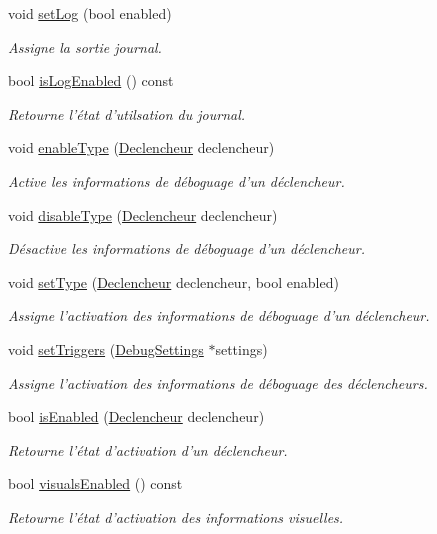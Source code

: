\begin{DoxyCompactItemize}
void \hyperlink{group__inf2990_gafa37fad6a0a050a913eb0e482f1b0282}{set\-Log} (bool enabled)
\begin{DoxyCompactList}\small\item\em Assigne la sortie journal. \end{DoxyCompactList}\item 
bool \hyperlink{group__inf2990_gae22799c006444ad7f48e7de490b41ef0}{is\-Log\-Enabled} () const 
\begin{DoxyCompactList}\small\item\em Retourne l'état d'utilsation du journal. \end{DoxyCompactList}\item 
void \hyperlink{group__inf2990_ga55375c6c14be967ed7f25eed578a6265}{enable\-Type} (\hyperlink{class_debug_afd6ed3c50c08d0a7830cd5253b4ab8b6}{Declencheur} declencheur)
\begin{DoxyCompactList}\small\item\em Active les informations de déboguage d'un déclencheur. \end{DoxyCompactList}\item 
void \hyperlink{group__inf2990_gaefa863abf2c2b3c6c741b88b3f78e8b3}{disable\-Type} (\hyperlink{class_debug_afd6ed3c50c08d0a7830cd5253b4ab8b6}{Declencheur} declencheur)
\begin{DoxyCompactList}\small\item\em Désactive les informations de déboguage d'un déclencheur. \end{DoxyCompactList}\item 
void \hyperlink{group__inf2990_gaf6b5623dc8f2fdc90abb3648499f3415}{set\-Type} (\hyperlink{class_debug_afd6ed3c50c08d0a7830cd5253b4ab8b6}{Declencheur} declencheur, bool enabled)
\begin{DoxyCompactList}\small\item\em Assigne l'activation des informations de déboguage d'un déclencheur. \end{DoxyCompactList}\item 
void \hyperlink{group__inf2990_gac502f42b3b17b681eaf0652836221177}{set\-Triggers} (\hyperlink{struct_debug_settings}{Debug\-Settings} $\ast$settings)
\begin{DoxyCompactList}\small\item\em Assigne l'activation des informations de déboguage des déclencheurs. \end{DoxyCompactList}\item 
bool \hyperlink{group__inf2990_ga63c334cf7a3be794bb8b349c4938613d}{is\-Enabled} (\hyperlink{class_debug_afd6ed3c50c08d0a7830cd5253b4ab8b6}{Declencheur} declencheur)
\begin{DoxyCompactList}\small\item\em Retourne l'état d'activation d'un déclencheur. \end{DoxyCompactList}\item 
bool \hyperlink{group__inf2990_ga15e281e19fa3282487c656ad14d55ee4}{visuals\-Enabled} () const 
\begin{DoxyCompactList}\small\item\em Retourne l'état d'activation des informations visuelles. \end{DoxyCompactList}\end{DoxyCompactItemize}
